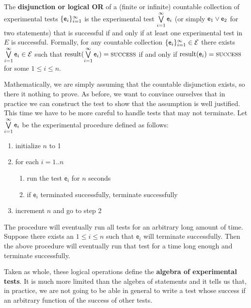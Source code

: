 \documentclass[11pt,letterpaper,fleqn]{memoir} %
\begin{document}
\begin{mathSection}
	\begin{defn}\label{def_experimental_test_OR}
	The \textbf{disjunction or logical OR} of a (finite or infinite) countable collection of experimental tests $\{\mathsf{e}_i\}_{i=1}^{\infty}$ is the experimental test $\bigvee\limits_{i=1}^{\infty} \mathsf{e}_i$ (or simply $\mathsf{e}_1 \vee \mathsf{e}_2$ for two statements) that is successful if and only if at least one experimental test in $E$ is successful. Formally, for any countable collection $\{\mathsf{e}_i\}_{i=1}^{\infty} \in \mathcal{E}$ there exists $ \bigvee\limits_{i=1}^{\infty} \mathsf{e}_i \in \mathcal{E}$ such that $\operatorname{result}(\bigvee\limits_{i=1}^{\infty} \mathsf{e}_i) = \textsc{success}$ if and only if $\operatorname{result}(\mathsf{e}_i) = \textsc{success}$ for some $1 \leq i \leq n$.
	\end{defn}
	\begin{justification}
		Mathematically, we are simply assuming that the countable disjunction exists, so there it nothing to prove. As before, we want to convince ourselves that in practice we can construct the test to show that the assumption is well justified. This time we have to be more careful to handle tests that may not terminate.
		Let $\bigvee\limits_{i=1}^{\infty} \mathsf{e}_i$ be the experimental procedure defined as follows:
		\begin{enumerate}
			\item initialize $n$ to 1
			\item for each $i=1..n$
			\begin{enumerate}
				\item run the test $\mathsf{e}_i$ for $n$ seconds
				\item if $\mathsf{e}_i$ terminated successfully, terminate successfully
			\end{enumerate}
			\item increment $n$ and go to step 2
		\end{enumerate}
		The procedure will eventually run all tests for an arbitrary long amount of time. Suppose there exists an $1 \leq i \leq n$ such that $\mathsf{e}_i$ will terminate successfully. Then the above procedure will eventually run that test for a time long enough and terminate successfully.
	\end{justification}
\end{mathSection}

Taken as whole, these logical operations define the \textbf{algebra of experimental tests}. It is much more limited than the algebra of statements and it tells us that, in practice, we are not going to be able in general to write a test whose success if an arbitrary function of the success of other tests.
\end{document}

